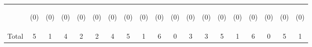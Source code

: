 \begin{tabular}{lcccccccccccccccccc}
 & \begin{footnotesize}(0)\end{footnotesize} & \begin{footnotesize}(0)\end{footnotesize} & \begin{footnotesize}(0)\end{footnotesize} & \begin{footnotesize}(0)\end{footnotesize} & \begin{footnotesize}(0)\end{footnotesize} & \begin{footnotesize}(0)\end{footnotesize} & \begin{footnotesize}(0)\end{footnotesize} & \begin{footnotesize}(0)\end{footnotesize} & \begin{footnotesize}(0)\end{footnotesize} & \begin{footnotesize}(0)\end{footnotesize} & \begin{footnotesize}(0)\end{footnotesize} & \begin{footnotesize}(0)\end{footnotesize} & \begin{footnotesize}(0)\end{footnotesize} & \begin{footnotesize}(0)\end{footnotesize} & \begin{footnotesize}(0)\end{footnotesize} & \begin{footnotesize}(0)\end{footnotesize} & \begin{footnotesize}(0)\end{footnotesize} & \begin{footnotesize}(0)\end{footnotesize}\\
\noalign{\smallskip}Total & 5 & 1 & 4 & 2 & 2 & 4 & 5 & 1 & 6 & 0 & 3 & 3 & 5 & 1 & 6 & 0 & 5 & 1\\

\end{tabular}
